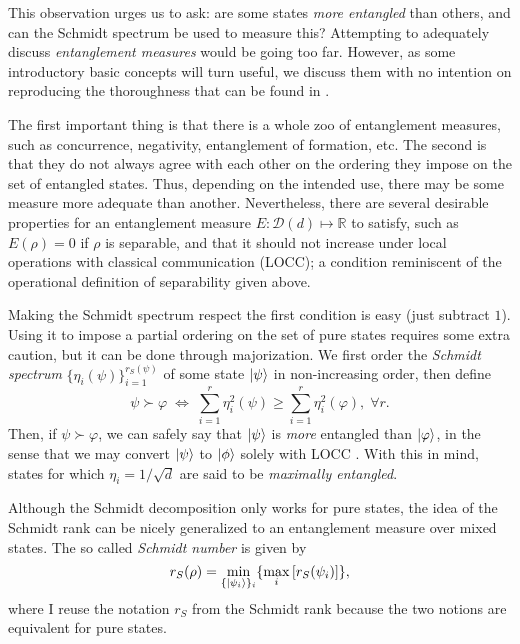 		This observation urges us to ask: are some states \emph{more entangled} than others, and can the Schmidt spectrum be used to measure this? Attempting to adequately discuss \emph{entanglement measures} would be going too far. However, as some introductory basic concepts will turn useful, we discuss them with no intention on reproducing the thoroughness that can be found in \cite{plenio_2007_entanglementmeasures,terra_tese,horodecki_2009_entanglement,dagmar_2002_entanglement}.
	
		The first important thing is that there is a whole zoo of entanglement measures, such as concurrence, negativity, entanglement of formation, etc. The second is that they do not always agree with each other on the ordering they impose on the set of entangled states. Thus, depending on the intended use, there may be some measure more adequate than another. Nevertheless, there are several desirable properties for an entanglement measure $E : \mathcal{D}(d) \mapsto \mathbb{R}$ to satisfy, such as $E(\rho) = 0$ if $\rho$ is separable, and that it should not increase under local operations with classical communication (LOCC); a condition reminiscent of the operational definition of separability given above.
	
		Making the Schmidt spectrum respect the first condition is easy (just subtract $1$). Using it to impose a partial ordering on the set of pure states requires some extra caution, but it can be done through majorization. We first order the \emph{Schmidt spectrum} $\{ \eta_i (\psi) \}_{i=1}^{r_S(\psi)}$ of some state $\ket{\psi}$ in non-increasing order, then define
		$$
			\psi \succ \varphi \;\Longleftrightarrow\; \sum_{i=1}^{r} \eta_i^2(\psi) \geq \sum_{i=1}^{r} \eta_i^2(\varphi), \;\forall r .
		$$
		Then, if $\psi \succ \varphi$, we can safely say that $\ket{\psi}$ is \emph{more} entangled than $\ket{\varphi}$, in the sense that we may convert $\ket{\psi}$ to $\ket{\phi}$ solely with LOCC \cite{nielsen_1999_majorization,terra_tese}. With this in mind, states for which $\eta_i = 1/\sqrt{d}$ are said to be \emph{maximally entangled}.
	
		Although the Schmidt decomposition only works for pure states, the idea of the Schmidt rank can be nicely generalized to an entanglement measure over mixed states. The so called \emph{Schmidt number} \cite{terhal_2000_schmidtnumber} is given by 
		$$
			r_S(\rho) = \min_{\{ \ket{\psi_i} \}_i} \{ \max_i \left[ r_S(\psi_i ) \right] \} ,
			\label{eq:schmidt-number}
		$$
		where I reuse the notation $r_S$ from the Schmidt rank because the two notions are equivalent for pure states.
	
